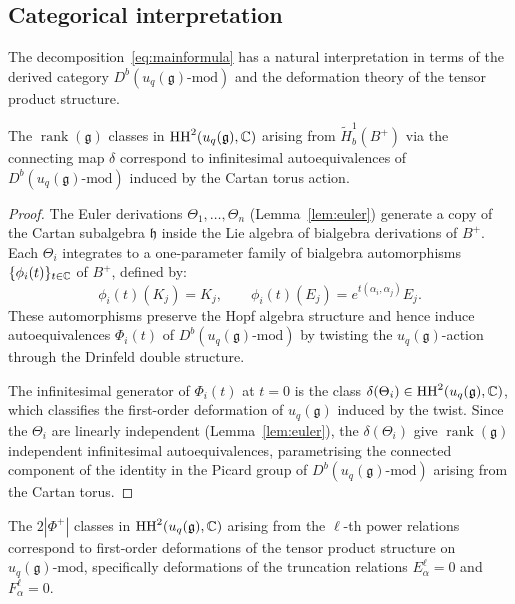 \subsection{Categorical interpretation}
\label{sec:categorical}

The decomposition~\eqref{eq:mainformula} has a natural interpretation in terms of the derived category $D^b(u_q(\mathfrak{g})\text{-mod})$ and the deformation theory of the tensor product structure.

\begin{proposition}
\label{prop:catrank}
The $\operatorname{rank}(\mathfrak{g})$ classes in $\operatorname{HH}^2(u_q(\mathfrak{g}), \mathbb{C})$ arising from $\tilde{H}^1_b(B^+)$ via the connecting map $\delta$ correspond to infinitesimal autoequivalences of $D^b(u_q(\mathfrak{g})\text{-mod})$ induced by the Cartan torus action.
\end{proposition}

\begin{proof}
The Euler derivations $\Theta_1, \ldots, \Theta_n$ (Lemma~\ref{lem:euler}) generate a copy of the Cartan subalgebra $\mathfrak{h}$ inside the Lie algebra of bialgebra derivations of $B^+$. Each $\Theta_i$ integrates to a one-parameter family of bialgebra automorphisms $\{\phi_i(t)\}_{t \in \mathbb{C}}$ of $B^+$, defined by:
\[
\phi_i(t)(K_j) = K_j, \qquad \phi_i(t)(E_j) = e^{t (\alpha_i, \alpha_j)} E_j.
\]
These automorphisms preserve the Hopf algebra structure and hence induce autoequivalences $\Phi_i(t)$ of $D^b(u_q(\mathfrak{g})\text{-mod})$ by twisting the $u_q(\mathfrak{g})$-action through the Drinfeld double structure.

The infinitesimal generator of $\Phi_i(t)$ at $t = 0$ is the class $\delta(\Theta_i) \in \operatorname{HH}^2(u_q(\mathfrak{g}), \mathbb{C})$, which classifies the first-order deformation of $u_q(\mathfrak{g})$ induced by the twist. Since the $\Theta_i$ are linearly independent (Lemma~\ref{lem:euler}), the $\delta(\Theta_i)$ give $\operatorname{rank}(\mathfrak{g})$ independent infinitesimal autoequivalences, parametrising the connected component of the identity in the Picard group of $D^b(u_q(\mathfrak{g})\text{-mod})$ arising from the Cartan torus.
\end{proof}

\begin{proposition}
\label{prop:catlth}
The $2|\Phi^+|$ classes in $\operatorname{HH}^2(u_q(\mathfrak{g}), \mathbb{C})$ arising from the $\ell$-th power relations correspond to first-order deformations of the tensor product structure on $u_q(\mathfrak{g})\text{-mod}$, specifically deformations of the truncation relations $E_\alpha^\ell = 0$ and $F_\alpha^\ell = 0$.
\end{proposition}

